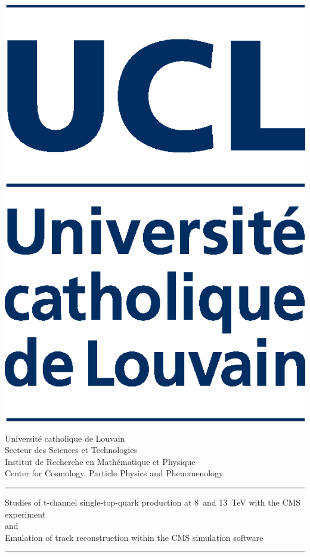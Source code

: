 \thispagestyle{empty}
\parbox{0.15\textwidth}{
\includegraphics[height=3.4\baselineskip]{figures/title/UCL.eps}
}\hfill\parbox{0.8\textwidth}{\small\raggedright
Universit{\'e} catholique de Louvain\\[0.1cm]
\footnotesize Secteur des Sciences et Technologies\\ 
Institut de Recherche en Math{\'e}matique et Physique\\ 
Center for Cosmology, Particle Physics and Phenomenology
}

\vspace{2cm}

\begin{center}
{\rule{\textwidth}{1pt}}

\vspace{0.1cm}

\parbox{0.95\textwidth}{
\numberfont\Large\centering
Studies of t-channel single-top-quark production at 8~and 13~TeV with the CMS experiment\\
and\\
Emulation of track reconstruction within the CMS simulation software
}

\vspace{0.1cm}

{\rule{\textwidth}{1pt}}
\end{center}
\vspace{1.cm}

